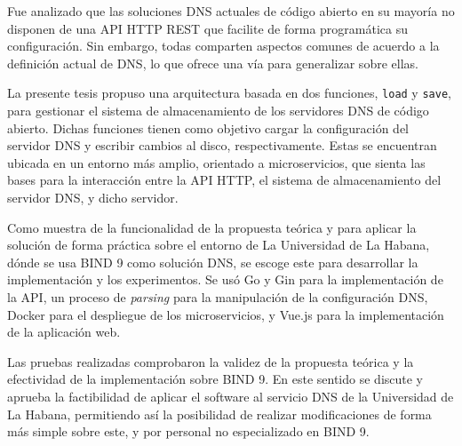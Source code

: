 \begin{conclusions}
Fue analizado que las soluciones DNS actuales de código abierto en su mayoría no disponen de una API HTTP REST que facilite de forma programática su configuración. Sin embargo, todas comparten aspectos comunes de acuerdo a la definición actual de DNS, lo que ofrece una vía para generalizar sobre ellas.

La presente tesis propuso una arquitectura basada en dos funciones, \verb|load| y \verb|save|, para gestionar el sistema de almacenamiento de los servidores DNS de código abierto. Dichas funciones tienen como objetivo cargar la configuración del servidor DNS y escribir cambios al disco, respectivamente. Estas se encuentran ubicada en un entorno más amplio, orientado a microservicios, que sienta las bases para la interacción entre la API HTTP, el sistema de almacenamiento del servidor DNS, y dicho servidor.

Como muestra de la funcionalidad de la propuesta teórica y para aplicar la solución de forma práctica sobre el entorno de La Universidad de La Habana, dónde se usa BIND 9 como solución DNS, se escoge este para desarrollar la implementación y los experimentos. Se usó Go y Gin para la implementación de la API, un proceso de \textit{parsing} para la manipulación de la configuración DNS, Docker para el despliegue de los microservicios, y Vue.js para la implementación de la aplicación web.

Las pruebas realizadas comprobaron la validez de la propuesta teórica y la efectividad de la implementación sobre BIND 9. En este sentido se discute y aprueba la factibilidad de aplicar el software al servicio DNS de la Universidad de La Habana, permitiendo así la posibilidad de realizar modificaciones de forma más simple sobre este, y por personal no especializado en BIND 9.
\end{conclusions}
